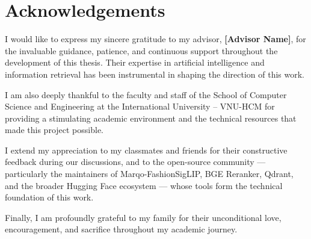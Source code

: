 \documentclass[12pt, twoside]{report}
\begin{document}
\begin{titlepage}
	\hspace{7cm}
	\makebox[7cm][l]{\underline{\hspace{7cm}}}
	\par \hspace{7cm}
	\par
	\vspace{0.75cm}
														
	\hspace{7cm}
	\par
	\thispagestyle{empty}
\end{titlepage}

\setcounter{page}{1}

\chapter*{Acknowledgements}

\noindent
I would like to express my sincere gratitude to my advisor, \textbf{[Advisor Name]}, for the invaluable guidance, patience, and continuous support throughout the development of this thesis. Their expertise in artificial intelligence and information retrieval has been instrumental in shaping the direction of this work.

\noindent
I am also deeply thankful to the faculty and staff of the School of Computer Science and Engineering at the International University -- VNU-HCM for providing a stimulating academic environment and the technical resources that made this project possible.

\noindent
I extend my appreciation to my classmates and friends for their constructive feedback during our discussions, and to the open-source community --- particularly the maintainers of Marqo-FashionSigLIP, BGE Reranker, Qdrant, and the broader Hugging Face ecosystem --- whose tools form the technical foundation of this work.

\noindent
Finally, I am profoundly grateful to my family for their unconditional love, encouragement, and sacrifice throughout my academic journey.

\renewcommand{\contentsname}{Table of Contents}
\tableofcontents
\thispagestyle{iuplain}
\end{document}
